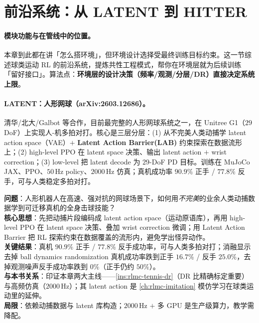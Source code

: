\section{前沿系统：从 LATENT 到 HITTER}
\label{sec:rlmc-tennis-frontier}

\paragraph{模块功能与在管线中的位置。}本章到此都在讲「怎么搭环境」，但环境设计选择受最终训练目标约束。这一节综述球类运动 RL 的前沿系统，提炼共性工程模式，帮你在环境层就为后续训练「留好接口」。算法点：\textbf{环境层的设计决策（频率/观测/分层/DR）直接决定系统上限}。

\paragraph{LATENT：人形网球（arXiv:2603.12686）。}清华/北大/Galbot 等合作\cite{tennis_latent2026}，目前最完整的人形网球系统之一，在 Unitree G1（$29$ DoF）上实现人-机多拍对打。核心是三层分层：(1) 从不完美人类动捕学 latent action space（VAE）$+$ \textbf{Latent Action Barrier(LAB)} 约束探索在数据流形上；(2) high-level PPO 在 latent space 决策、输出 latent action $+$ wrist correction；(3) low-level 把 latent decode 为 $29$-DoF PD 目标。训练在 MuJoCo JAX、PPO、$50$\,Hz policy、$2000$\,Hz 仿真；真机成功率 $90.9\%$ 正手 / $77.8\%$ 反手，可与人类稳定多拍对打。

\begin{paper}\label{paper:rlmc-tennis-latent}
\textbf{问题}：人形机器人在高速、强对抗的网球场景下，如何用\emph{不完美}的业余人类动捕数据学到可迁移真机的全身击球技能？\\
\textbf{核心思想}：先把动捕片段编码成 latent action space（运动原语库），再用 high-level PPO 在 latent space 决策、叠加 wrist correction 微调；用 Latent Action Barrier 把 RL 探索约束在数据覆盖的流形内，避免学出怪异动作。\\
\textbf{关键结果}：真机 $90.9\%$ 正手 / $77.8\%$ 反手成功率，可与人类多拍对打；消融显示去掉 ball dynamics randomization 真机成功率跌到正手 $16.7\%$ / 反手 $25.0\%$，去掉观测噪声反手成功率跌到 $0\%$（正手仍约 $50\%$）。\\
\textbf{与本书关系}：印证本章两大主线——\cref{ins:rlmc-tennis-dr}（DR 比精确标定重要）与高频仿真（$2000$\,Hz）；其 latent action 是 \cref{ch:rlmc-imitation} 模仿学习在球类运动里的延伸。\\
\textbf{局限}：依赖动捕数据与 latent 库构造；$2000$\,Hz $+$ 多 GPU 是生产级算力，教学需降配。
\end{paper}

